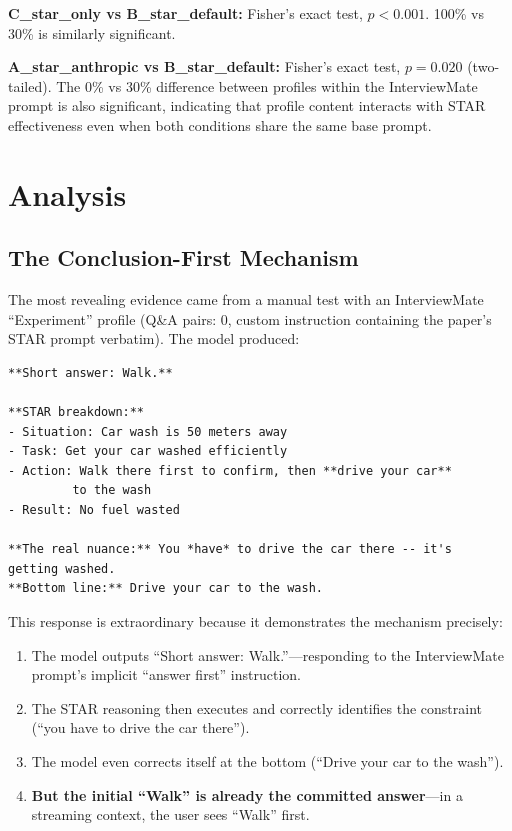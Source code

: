 \documentclass[11pt]{article}
\begin{document}
\textbf{C\_star\_only vs B\_star\_default:} Fisher's exact test, $p < 0.001$. 100\% vs 30\% is similarly significant.

\textbf{A\_star\_anthropic vs B\_star\_default:} Fisher's exact test, $p = 0.020$ (two-tailed). The 0\% vs 30\% difference between profiles within the InterviewMate prompt is also significant, indicating that profile content interacts with STAR effectiveness even when both conditions share the same base prompt.

\section{Analysis}

\subsection{The Conclusion-First Mechanism}

The most revealing evidence came from a manual test with an InterviewMate ``Experiment'' profile (Q\&A pairs: 0, custom instruction containing the paper's STAR prompt verbatim). The model produced:

\begin{lstlisting}
**Short answer: Walk.**

**STAR breakdown:**
- Situation: Car wash is 50 meters away
- Task: Get your car washed efficiently
- Action: Walk there first to confirm, then **drive your car**
         to the wash
- Result: No fuel wasted

**The real nuance:** You *have* to drive the car there -- it's
getting washed.
**Bottom line:** Drive your car to the wash.
\end{lstlisting}

This response is extraordinary because it demonstrates the mechanism precisely:

\begin{enumerate}[leftmargin=2em]
\item The model outputs ``Short answer: Walk.''---responding to the InterviewMate prompt's implicit ``answer first'' instruction.
\item The STAR reasoning then executes and correctly identifies the constraint (``you have to drive the car there'').
\item The model even corrects itself at the bottom (``Drive your car to the wash'').
\item \textbf{But the initial ``Walk'' is already the committed answer}---in a streaming context, the user sees ``Walk'' first.
\end{enumerate}
\end{document}
